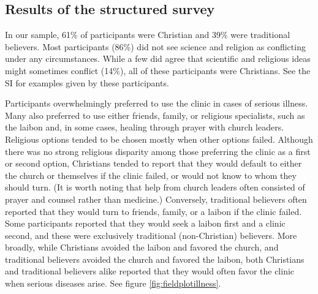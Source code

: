 \documentclass[
  11pt,
]{article}
\begin{document}
\hypertarget{results-of-the-structured-survey}{%
\subsection{Results of the structured survey}\label{results-of-the-structured-survey}}

In our sample, 61\% of participants were Christian and 39\% were traditional believers. Most participants (86\%) did not see science and religion as conflicting under any circumstances. While a few did agree that scientific and religious ideas might sometimes conflict (14\%), all of these participants were Christians. See the SI for examples given by these participants.

Participants overwhelmingly preferred to use the clinic in cases of serious illness. Many also preferred to use either friends, family, or religious specialists, such as the laibon and, in some cases, healing through prayer with church leaders. Religious options tended to be chosen mostly when other options failed. Although there was no strong religious disparity among those preferring the clinic as a first or second option, Christians tended to report that they would default to either the church or themselves if the clinic failed, or would not know to whom they should turn. (It is worth noting that help from church leaders often consisted of prayer and counsel rather than medicine.) Conversely, traditional believers often reported that they would turn to friends, family, or a laibon if the clinic failed. Some participants reported that they would seek a laibon first and a clinic second, and these were exclusively traditional (non-Christian) believers. More broadly, while Christians avoided the laibon and favored the church, and traditional believers avoided the church and favored the laibon, both Christians and traditional believers alike reported that they would often favor the clinic when serious diseases arise. See figure \ref{fig:fieldplotillness}.
\end{document}
